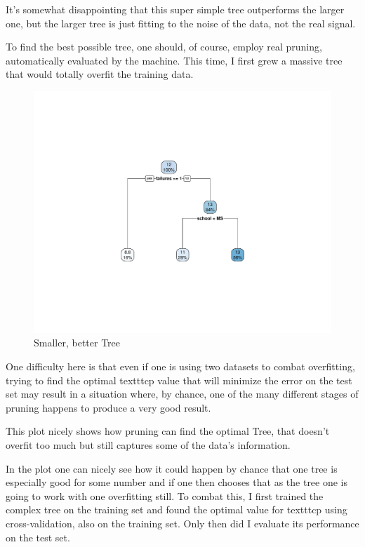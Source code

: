 \documentclass[12pt]{article}
\begin{document}
It's somewhat disappointing that this super simple tree outperforms the larger one, but the larger tree is just fitting to the noise of the data, not the real signal.

To find the best possible tree, one should, of course, employ real pruning, automatically evaluated by the machine. This time, I first grew a massive tree that would totally overfit the training data.

\begin{figure}
    \centering
    \includegraphics[scale=0.30]{small_manual_tree.pdf}
    \caption{Smaller, better Tree}
\end{figure}

One difficulty here is that even if one is using two datasets to combat overfitting, trying to find the optimal texttt{cp} value that will minimize the error on the test set may result in a situation where, by chance, one of the many different stages of pruning happens to produce a very good result.

This plot nicely shows how pruning can find the optimal Tree, that doesn't overfit too much but still captures some of the data's information.

In the  plot one can nicely see how it could happen by chance that one tree is especially good for some number and if one then chooses that as the tree one is going to work with one overfitting still.
To combat this, I first trained the complex tree on the training set and found the optimal value for texttt{cp} using cross-validation, also on the training set. Only then did I evaluate its performance on the test set.
\end{document}
